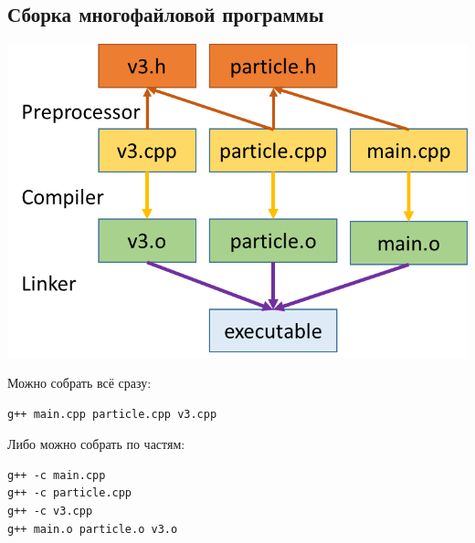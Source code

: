 \documentclass{article}
\begin{document}
\subsection*{Сборка многофайловой программы}
\begin{center}
\includegraphics[scale=0.7]{../images/separate_compilation_linking.png}
\end{center}
Можно собрать всё сразу:
\begin{lstlisting}
g++ main.cpp particle.cpp v3.cpp
\end{lstlisting}
Либо можно собрать по частям:
\begin{lstlisting}
g++ -c main.cpp
g++ -c particle.cpp
g++ -c v3.cpp
g++ main.o particle.o v3.o
\end{lstlisting}
\end{document}
